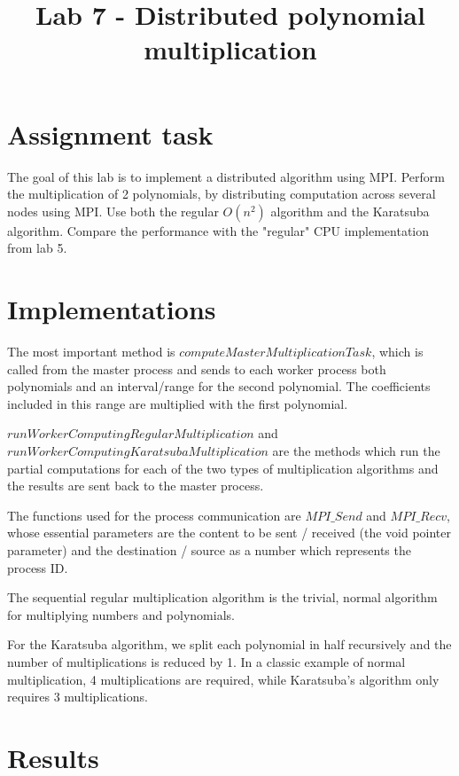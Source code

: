 \documentclass[journal, onecolumn, 12pt]{IEEEtran}
\begin{document}
\title{Lab 7 - Distributed polynomial multiplication\\
}

\author{
}

\maketitle

\section{Assignment task}
The goal of this lab is to implement a distributed algorithm using MPI.
Perform the multiplication of 2 polynomials, by distributing computation across several nodes using MPI. Use both the regular $ O(n^2) $ algorithm and the Karatsuba algorithm. Compare the performance with the "regular" CPU implementation from lab 5.

\section{Implementations}
The most important method is $ computeMasterMultiplicationTask $, which is called from the master process and sends to each worker process both polynomials and an interval/range for the second polynomial. The coefficients included in this range are multiplied with the first polynomial.

$ runWorkerComputingRegularMultiplication $ and $ runWorkerComputingKaratsubaMultiplication $ are the methods which run the partial computations for each of the two types of multiplication algorithms and the results are sent back to the master process. 

The functions used for the process communication are $ MPI\_Send $ and $ MPI\_Recv $, whose essential parameters are the content to be sent / received (the void pointer parameter) and the destination / source as a number which represents the process ID.

The sequential regular multiplication algorithm is the trivial, normal algorithm for multiplying numbers and polynomials. 

For the Karatsuba algorithm, we split each polynomial in half recursively and the number of multiplications is reduced by 1. In a classic example of normal multiplication, 4 multiplications are required, while Karatsuba's algorithm only requires 3 multiplications. 

\section{Results}
\end{document}
